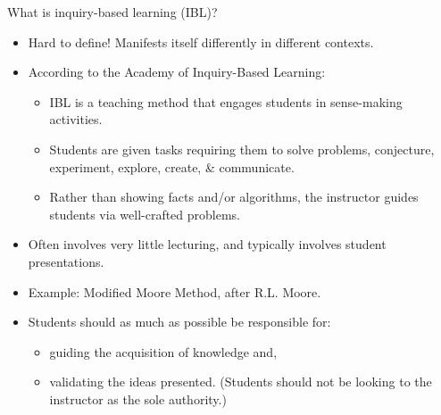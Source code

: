 \documentclass[10pt,handout]{beamer}
\begin{document}
\begin{frame}

\begin{block}{What is inquiry-based learning (IBL)?}
\begin{itemize}
\item Hard to define! Manifests itself differently in different contexts.
\item According to the \alert{Academy of Inquiry-Based Learning}:
\begin{itemize}\normalsize
\item IBL is a teaching method that engages students in sense-making activities.
\item Students are given tasks requiring them to solve problems, conjecture, experiment, explore, create, & communicate.
\item Rather than showing facts and/or algorithms, the instructor guides students via well-crafted problems.
\end{itemize}
\item Often involves very little lecturing, and typically involves student presentations.
\item Example: Modified Moore Method, after R.L. Moore.
\item Students should as much as possible be responsible for:
\begin{itemize}\normalsize
\item guiding the acquisition of knowledge and,
\item validating the ideas presented. (Students should not be looking to the instructor as the sole authority.)
\end{itemize}
\end{itemize}
\end{block}

\end{frame}

\end{document}
